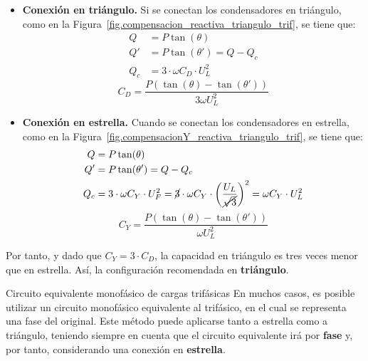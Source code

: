 \documentclass[11pt]{book} %
\makeatletter
\numberwithin{dummy}{section}
\theoremstyle{ocrenumbox}
\theoremstyle{blacknumex}
\theoremstyle{blacknumbox}
\theoremstyle{ocrenum}
\renewcommand{\section}{\@startsection{section}{1}{\z@}
{-4ex \@plus -1ex \@minus -.4ex}
{1ex \@plus.2ex }
{\normalfont\large\sffamily\bfseries}}
\makeatother
\begin{document}
		\begin{itemize}
		    \item \textbf{Conexión en triángulo.} Si se conectan los condensadores en triángulo, como en la Figura~\ref{fig.compensacion_reactiva_triangulo_trif}, se tiene que: 
		\begin{align*}
          Q &= P\tan(\theta)\\
          Q' &= P\tan(\theta') = Q - Q_c\\
          Q_c &= 3 \cdot \omega C_D \cdot U_L^2
        \end{align*}
        \begin{equation}
            \boxed{C_D = \frac{P(\tan (\theta) - \tan (\theta'))}{3\omega U_L^2}}
        \end{equation}
		    \item \textbf{Conexión en estrella.} Cuando se conectan los condensadores en estrella, como en la Figura~\ref{fig.compensacionY_reactiva_triangulo_trif}, se tiene que: 
		\begin{align*}
          Q &= P\tan(\theta)\\
          Q' &= P\tan(\theta') = Q - Q_c\\
          Q_c &= 3 \cdot \omega C_Y \cdot U_F^2 = \cancel{3} \cdot \omega C_Y \cdot \left(\dfrac{U_L}{\cancel{\sqrt{3}}}\right)^2=\omega C_Y \cdot U_L^2
        \end{align*}
        \begin{equation}
            \boxed{C_Y = \frac{P(\tan (\theta) - \tan (\theta'))}{\omega U_L^2}}
        \end{equation}
		\end{itemize}
		
		Por tanto, y dado que $C_Y = 3 \cdot C_D$, la capacidad en triángulo es tres veces menor que en estrella. Así, la configuración recomendada en \textbf{triángulo}.
		
		
		
		\section{Circuito equivalente monofásico de cargas trifásicas}\label{sec.c_eq_mon}
	 En muchos casos, es posible utilizar un circuito monofásico equivalente al trifásico, en el cual se representa una fase del original. Este método puede aplicarse tanto a estrella como a triángulo, teniendo siempre en cuenta que el circuito equivalente irá por \textbf{fase} y, por tanto, considerando una conexión en \textbf{estrella}. 
	
\end{document}
